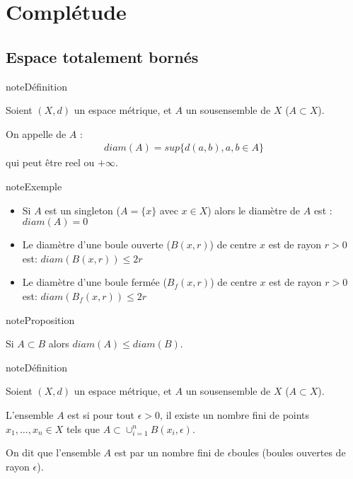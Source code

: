 \documentclass[letterpaper,10pt,french]{sphinxmanual}
\begin{document}
\section{Complétude}
\label{\detokenize{complet:completude}}\label{\detokenize{complet::doc}}

\subsection{Espace totalement bornés}
\label{\detokenize{complet:espace-totalement-bornes}}
\begin{sphinxadmonition}{note}{Définition}

\sphinxAtStartPar
Soient \((X, d)\) un espace métrique, et \(A\) un sous\sphinxhyphen{}ensemble de \(X\) (\(A\subset X\)).

\sphinxAtStartPar
On appelle  de \(A\) :
\begin{equation*}
\begin{split}
diam(A)= sup\{d(a,b), a, b \in A\}
\end{split}
\end{equation*}
\sphinxAtStartPar
qui peut être reel ou \(+\infty\).
\end{sphinxadmonition}

\begin{sphinxadmonition}{note}{Exemple}
\begin{itemize}
\item {} 
\sphinxAtStartPar
Si \(A\) est un singleton (\(A= \{x\}\) avec \(x\in X\)) alors le diamètre de \(A\) est : \(diam(A)=0\)

\item {} 
\sphinxAtStartPar
Le diamètre d’une boule ouverte (\(B(x,r)\)) de centre \(x\) est de rayon \(r>0\)  est: \(diam(B(x,r))\leq 2r\)

\item {} 
\sphinxAtStartPar
Le diamètre d’une boule fermée (\(B_f(x,r)\)) de centre \(x\) est de rayon \(r>0\)  est: \(diam(B_f(x,r))\leq 2r\)

\end{itemize}
\end{sphinxadmonition}

\begin{sphinxadmonition}{note}{Proposition}

\sphinxAtStartPar
Si \(A\subset B\) alors \(diam(A)\leq diam(B)\).
\end{sphinxadmonition}

\begin{sphinxadmonition}{note}{Définition}

\sphinxAtStartPar
Soient \((X, d)\) un espace métrique, et \(A\) un sous\sphinxhyphen{}ensemble de \(X\) (\(A\subset X\)).

\sphinxAtStartPar
L’ensemble \(A\) est  si pour tout \(\epsilon>0\), il existe un nombre fini de points \(x_1, \ldots, x_n \in X\) tels que \(A\subset \cup_{i=1}^nB(x_i, \epsilon)\).

\sphinxAtStartPar
On dit que l’ensemble \(A\) est  par un nombre fini de \(\epsilon\)\sphinxhyphen{}boules (boules ouvertes de rayon \(\epsilon\)).
\end{sphinxadmonition}
\end{document}
